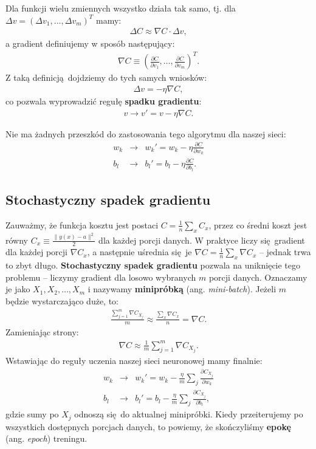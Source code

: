 \documentclass[10pt, oneside]{article}
\theoremstyle{remark}
\begin{document}
Dla funkcji wielu zmiennych wszystko działa tak samo, tj. dla $\Delta v = (\Delta v_1, \ldots, \Delta v_m)^T$ mamy:
\begin{eqnarray} 
  \Delta C \approx \nabla C \cdot \Delta v,
\end{eqnarray}
a gradient definiujemy w sposób następujący:
\begin{eqnarray}
  \nabla C \equiv \left(\frac{\partial C}{\partial v_1}, \ldots, 
  \frac{\partial C}{\partial v_m}\right)^T.
\end{eqnarray}
Z taką definicją dojdziemy do tych samych wniosków:
\begin{eqnarray}
  \Delta v = -\eta \nabla C,
\end{eqnarray}
co pozwala wyprowadzić regułę \textbf{spadku gradientu}:
\begin{eqnarray}
  v \rightarrow v' = v-\eta \nabla C.
\end{eqnarray}

Nie ma żadnych przeszkód do zastosowania tego algorytmu dla naszej sieci:
\begin{eqnarray}
  w_k & \rightarrow & w_k' = w_k-\eta \frac{\partial C}{\partial w_k} \\
  b_l & \rightarrow & b_l' = b_l-\eta \frac{\partial C}{\partial b_l}.
\end{eqnarray}


\subsection{Stochastyczny spadek gradientu}

Zauważmy, że funkcja kosztu jest postaci $C = \frac{1}{n} \sum_x C_x$, przez co średni koszt jest równy $C_x \equiv \frac{\|y(x)-a\|^2}{2}$ dla każdej porcji danych.
W praktyce liczy się gradient dla każdej porcji $\nabla C_x$, a następnie uśrednia się je $\nabla C = \frac{1}{n}\sum_x \nabla C_x$ -- jednak trwa to zbyt długo.
\textbf{Stochastyczny spadek gradientu} pozwala na uniknięcie tego problemu -- liczymy gradient dla losowo wybranych $m$ porcji danych.
Oznaczamy je jako $X_1, X_2, \ldots, X_m$ i nazywamy \textbf{minipróbką} (ang. \emph{mini-batch}).
Jeżeli $m$ będzie wystarczająco duże, to:
\begin{eqnarray}
  \frac{\sum_{j=1}^m \nabla C_{X_{j}}}{m} \approx \frac{\sum_x \nabla C_x}{n} = \nabla C.
\end{eqnarray}
Zamieniając strony:
\begin{eqnarray}
  \nabla C \approx \frac{1}{m} \sum_{j=1}^m \nabla C_{X_{j}}.
\end{eqnarray}
Wstawiając do reguły uczenia naszej sieci neuronowej mamy finalnie:
\begin{eqnarray} 
  w_k & \rightarrow & w_k' = w_k-\frac{\eta}{m}
  \sum_j \frac{\partial C_{X_j}}{\partial w_k} \\
  b_l & \rightarrow & b_l' = b_l-\frac{\eta}{m}
  \sum_j \frac{\partial C_{X_j}}{\partial b_l},
\end{eqnarray}
gdzie sumy po $X_j$ odnoszą się do aktualnej minipróbki.
Kiedy przeiterujemy po wszystkich dostępnych porcjach danych, to powiemy, że skończyliśmy \textbf{epokę} (ang. \emph{epoch}) treningu.
\end{document}
